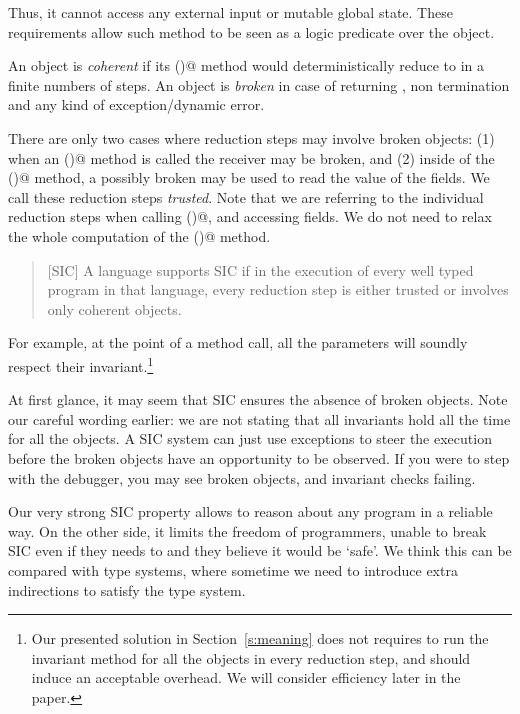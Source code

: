 Thus, it cannot access any external input or mutable global state.
These requirements allow such method to be seen as a logic predicate over the object.

An object is \textit{coherent} if its \Q@invariant()@ method
would deterministically reduce to \Q@true@ in a finite numbers of steps.
An object is \textit{broken} in case of \Q@invariant@ returning \Q@false@, non termination and any kind of exception/dynamic error.

There are only two cases where reduction steps may involve broken objects:
(1) when an \Q@invariant()@ method is called the receiver may be broken, and (2) inside of the \Q@invariant()@ method, a possibly
broken \Q@this@ may be used to read the value of the fields.
We call these reduction steps \emph{trusted}.
Note that we are referring to the individual reduction steps when calling \Q@invariant()@,
and accessing fields. We do not need to relax the whole computation of the \Q@invariant()@ method.


\begin{quote}[SIC]
A language supports SIC
if in the execution of every well typed program in that language,
every reduction step is either trusted or involves only coherent objects.
\end{quote}

\noindent For example, at the point of a method call,
all the parameters will soundly respect their invariant.\footnote{
Our presented solution in Section~\ref{s:meaning} does not requires to run the invariant method for all the objects
in every reduction step, and should induce an acceptable overhead. We will consider efficiency later in the paper.}

\noindent At first glance, it may seem that SIC ensures the absence of broken objects.
Note our careful wording earlier: we are not stating that all invariants hold all the time for all the objects.
A SIC system can just use exceptions to
steer the execution before the broken objects have an opportunity to be observed.
If you were to step with the debugger, you may see broken objects, and
invariant checks failing.

Our very strong SIC property allows to reason about any program in a reliable way.
On the other side, it limits the freedom of programmers,
unable to break SIC even if they needs to and they believe it would be `safe'.
We think this can be compared with type systems, where sometime we
need to introduce extra indirections to satisfy the type system.

